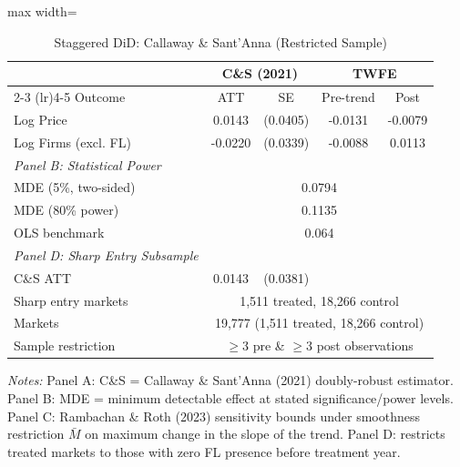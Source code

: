 \begin{table}[htbp]
\centering
\caption{Staggered DiD: Callaway \& Sant'Anna (Restricted Sample)}
\label{tab:did_revised}
\begin{adjustbox}{max width=\textwidth}
\begin{threeparttable}
\small
\begin{tabular}{lcccc}
\toprule
 & \multicolumn{2}{c}{C\&S (2021)} & \multicolumn{2}{c}{TWFE} \\
\cmidrule(lr){2-3} \cmidrule(lr){4-5}
Outcome & ATT & SE & Pre-trend & Post \\
\midrule
Log Price & 0.0143 & (0.0405) & -0.0131 & -0.0079 \\
Log Firms (excl. FL) & -0.0220 & (0.0339) & -0.0088 & 0.0113 \\
\midrule
\textit{Panel B: Statistical Power} & & & & \\
MDE (5\%, two-sided) & \multicolumn{4}{c}{0.0794} \\
MDE (80\% power) & \multicolumn{4}{c}{0.1135} \\
OLS benchmark & \multicolumn{4}{c}{0.064} \\
\midrule
\textit{Panel D: Sharp Entry Subsample} & & & & \\
C\&S ATT & 0.0143 & (0.0381) & & \\
Sharp entry markets & \multicolumn{4}{c}{1,511 treated, 18,266 control} \\
\midrule
Markets & \multicolumn{4}{c}{19,777 (1,511 treated, 18,266 control)} \\
Sample restriction & \multicolumn{4}{c}{$\geq$3 pre \& $\geq$3 post observations} \\
\bottomrule
\end{tabular}
\begin{tablenotes}
\small
\item \textit{Notes:} Panel A: C\&S = Callaway \& Sant'Anna (2021) doubly-robust estimator.
Panel B: MDE = minimum detectable effect at stated significance/power levels.
Panel C: Rambachan \& Roth (2023) sensitivity bounds under smoothness restriction $\bar{M}$
on maximum change in the slope of the trend.
Panel D: restricts treated markets to those with zero FL presence before treatment year.
\end{tablenotes}
\end{threeparttable}
\end{adjustbox}
\end{table}
